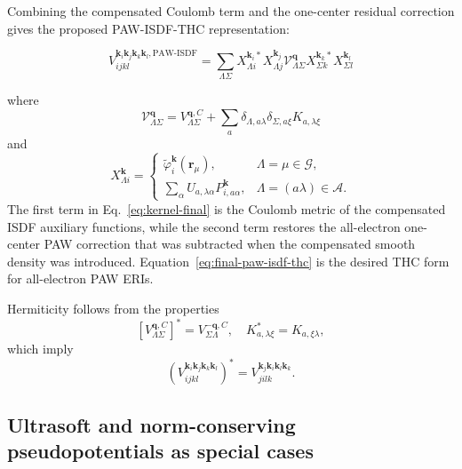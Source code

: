 \documentclass[aps,prb,reprint,superscriptaddress,longbibliography,nofootinbib]{revtex4-2}
\newcommand{\br}{\mathbf r}
\newcommand{\bk}{\mathbf k}
\newcommand{\bq}{\mathbf q}
\newcommand{\PAW}{\mathrm{PAW}}
\newcommand{\ISDF}{\mathrm{ISDF}}
\begin{document}
Combining the compensated Coulomb term and the one-center residual correction gives the proposed PAW-ISDF-THC representation:
\begin{widetext}
\begin{equation}
\boxed{
V_{ijkl}^{\bk_i\bk_j\bk_k\bk_l,\PAW\text{-}\ISDF}
=
\sum_{\Lambda\Sigma}
X_{\Lambda i}^{\bk_i *}X_{\Lambda j}^{\bk_j}
\mathcal V_{\Lambda\Sigma}^{\bq}
X_{\Sigma k}^{\bk_k *}X_{\Sigma l}^{\bk_l}
}
\label{eq:final-paw-isdf-thc}
\end{equation}
\end{widetext}
where
\begin{equation}
\boxed{
\mathcal V_{\Lambda\Sigma}^{\bq}
=V_{\Lambda\Sigma}^{\bq,C}
+
\sum_a
\delta_{\Lambda,a\lambda}\delta_{\Sigma,a\xi}
K_{a,\lambda\xi}
}
\label{eq:kernel-final}
\end{equation}
and
\begin{equation}
X_{\Lambda i}^{\bk}
=
\begin{cases}
\widetilde\varphi_i^{\bk}(\br_\mu), & \Lambda=\mu\in\mathcal G,\\[4pt]
\displaystyle\sum_\alpha U_{a,\lambda\alpha}P_{i,a\alpha}^{\bk}, & \Lambda=(a\lambda)\in\mathcal A.
\end{cases}
\label{eq:x-final}
\end{equation}
The first term in Eq.~\eqref{eq:kernel-final} is the Coulomb metric of the compensated ISDF auxiliary functions, while the second term restores the all-electron one-center PAW correction that was subtracted when the compensated smooth density was introduced.  Equation~\eqref{eq:final-paw-isdf-thc} is the desired THC form for all-electron PAW ERIs.

Hermiticity follows from the properties
\begin{equation}
\left[V_{\Lambda\Sigma}^{\bq,C}\right]^*
=V_{\Sigma\Lambda}^{-\bq,C},
\quad
K_{a,\lambda\xi}^*=K_{a,\xi\lambda},
\label{eq:hermiticity}
\end{equation}
which imply
\begin{equation}
\left(V_{ijkl}^{\bk_i\bk_j\bk_k\bk_l}\right)^*
=V_{jilk}^{\bk_j\bk_i\bk_l\bk_k}.
\label{eq:eri-hermitian}
\end{equation}

\subsection{Ultrasoft and norm-conserving pseudopotentials as special cases}
\label{sec:uspp}
\end{document}

